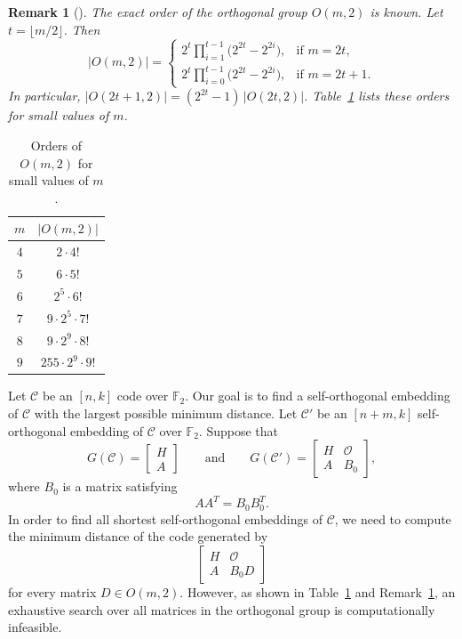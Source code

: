 \documentclass{article}
\newtheorem{remark}{Remark}
\begin{document}
\begin{remark}[\cite{m-1969}]\label{orthogonal-group-order}
The exact order of the orthogonal group $O(m,2)$ is known. Let $t=\lfloor m/2\rfloor$. Then
\[
|O(m,2)|=
\begin{cases}
\displaystyle 2^{t}\prod_{i=1}^{t-1}\bigl(2^{2t}-2^{2i}\bigr), & \text{if } m=2t,\\[3mm]
\displaystyle 2^{t}\prod_{i=0}^{t-1}\bigl(2^{2t}-2^{2i}\bigr), & \text{if } m=2t+1.
\end{cases}
\]
In particular, $|O(2t+1,2)|=(2^{2t}-1)\,|O(2t,2)|$. Table~\ref{tab:orders-orthogonal-groups} lists these orders for small values of $m$.
\end{remark}
\begin{table}[h]
\centering
\begin{tabular}{c|c}
\hline
$m$ & $|O(m, 2)|$ \\
\hline
$4$ & $2\cdot 4!$ \\
$5$ & $6\cdot 5!$ \\
$6$ & $2^5\cdot 6!$ \\
$7$ & $9\cdot 2^5\cdot 7!$ \\
$8$ & $9\cdot 2^9\cdot 8!$ \\
$9$ & $255\cdot 2^9\cdot 9!$ \\
\hline
\end{tabular}
\caption{Orders of $O(m, 2)$ for small values of $m$.}
\label{tab:orders-orthogonal-groups}
\end{table}
Let $\mathcal{C}$ be an $[n,k]$ code over $\mathbb{F}_2$. Our goal is to find a self-orthogonal embedding of $\mathcal{C}$ with the largest possible minimum distance. Let $\mathcal{C}'$ be an $[n+m,k]$ self-orthogonal embedding of $\mathcal{C}$ over $\mathbb{F}_2$. Suppose that
\[
G(\mathcal{C})=
\begin{bmatrix}
H\\
A
\end{bmatrix}
\qquad \text{and} \qquad
G(\mathcal{C}')=
\begin{bmatrix}
H & \mathcal{O}\\
A & B_0
\end{bmatrix},
\]
where $B_0$ is a matrix satisfying
\[
AA^T=B_0B_0^T.
\]
In order to find all shortest self-orthogonal embeddings of $\mathcal{C}$, we need to compute the minimum distance of the code generated by
\[
\begin{bmatrix}
H & \mathcal{O}\\
A & B_0D
\end{bmatrix}
\]
for every matrix $D\in O(m,2)$. However, as shown in Table~\ref{tab:orders-orthogonal-groups} and Remark~\ref{orthogonal-group-order}, an exhaustive search over all matrices in the orthogonal group is computationally infeasible.
\end{document}
